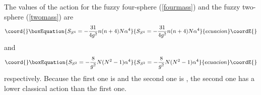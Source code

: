 \documentclass[a4paper,11pt]{article}
\begin{document}
\vspace{0.4cm}
The values of the action for the fuzzy four-sphere (\ref{fourmass}) 
and the fuzzy two-sphere (\ref{twomass}) are 
\begin{equation}\coord{}\boxEquation{ 
S_{S^{4}}=-\frac{31}{4g^{2}}n(n+4)N\alpha^{4} 
}{ 
S_{S^{4}}=-\frac{31}{4g^{2}}n(n+4)N\alpha^{4} 
}{ecuacion}\coordE{}\end{equation} 
and  
\begin{equation}\coord{}\boxEquation{ 
S_{S^{2}}=-\frac{8}{g^{2}}N(N^{2}-1)\alpha^{4} 
}{ 
S_{S^{2}}=-\frac{8}{g^{2}}N(N^{2}-1)\alpha^{4} 
}{ecuacion}\coordE{}\end{equation} 
respectively. Because the first one is 
\coordHE{} 
and the second one is \coordHE{}, 
the second one has a lower classical action than the first one. 














\end{document}
